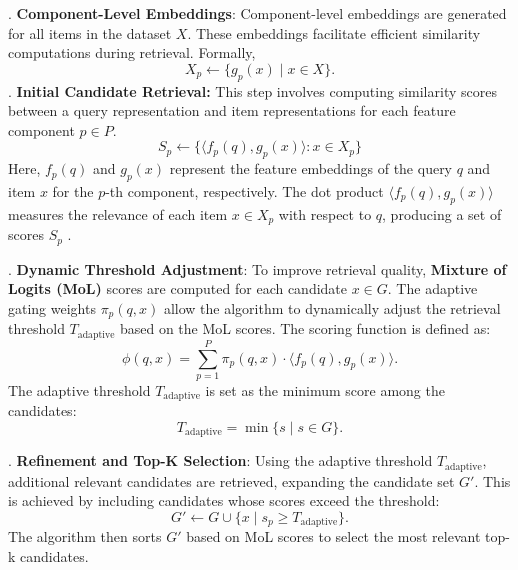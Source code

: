 \documentclass[Afour,sageh,times]{sagej}
\begin{document}
. \textbf{Component-Level Embeddings}:  
Component-level embeddings are generated for all items in the dataset \(X\). These embeddings facilitate efficient similarity computations during retrieval. Formally,
\begin{equation}
X_p \leftarrow \{g_p(x) \mid x \in X\}.
\end{equation}
.\textbf{ Initial Candidate Retrieval:} This step involves computing similarity scores between a query representation and item representations for each feature component $p \in P$.  
\begin{equation}
S_p \gets  \{ \langle f_p(q), g_p(x) \rangle : x \in X_p \}
\label{eq:initial_retrieval}
\end{equation}
Here, $f_p(q)$ and $g_p(x)$ represent the feature embeddings of the query $q$ and item $x$ for the $p$-th component, respectively. The dot product $\langle f_p(q), g_p(x) \rangle$ measures the relevance of each item $x \in X_p$ with respect to $q$, producing a set of scores $S_p$ .

. \textbf{Dynamic Threshold Adjustment}:  
To improve retrieval quality, \textbf{Mixture of Logits (MoL)} scores are computed for each candidate \(x \in G\). The adaptive gating weights \(\pi_p(q, x)\) allow the algorithm to dynamically adjust the retrieval threshold \(T_{\text{adaptive}}\) based on the MoL scores. The scoring function is defined as:
\begin{equation}
\phi(q, x) = \sum_{p=1}^{P} \pi_p(q, x) \cdot \langle f_p(q), g_p(x) \rangle.
\label{similarity_function}
\end{equation}
The adaptive threshold \(T_{\text{adaptive}}\) is set as the minimum score among the candidates:
\begin{equation}
T_{\text{adaptive}} = \min\{s \mid s \in G\}.
\end{equation}

. \textbf{Refinement and Top-K Selection}:  
Using the adaptive threshold \(T_{\text{adaptive}}\), additional relevant candidates are retrieved, expanding the candidate set \(G'\). This is achieved by including candidates whose scores exceed the threshold:
\begin{equation}
G' \leftarrow G \cup \{x \mid s_p \geq T_{\text{adaptive}}\}.
\end{equation}
The algorithm then sorts \(G'\) based on MoL scores to select the most relevant top-k candidates.
\end{document}
